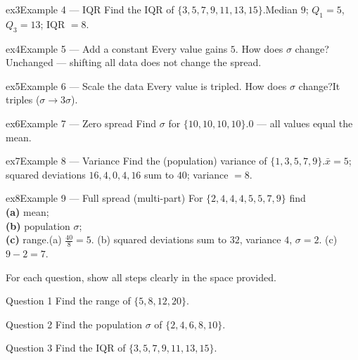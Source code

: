 \documentclass[11pt]{article}
\begin{document}
\begin{example}{ex3}{Example 4 --- IQR}
Find the IQR of $\{3,5,7,9,11,13,15\}$.\soln Median $9$; $Q_1=5$, $Q_3=13$; IQR $=8$.
\end{example}

\begin{example}{ex4}{Example 5 --- Add a constant}
Every value gains $5$. How does $\sigma$ change?\soln Unchanged --- shifting all data does not change the spread.
\end{example}

\begin{example}{ex5}{Example 6 --- Scale the data}
Every value is tripled. How does $\sigma$ change?\soln It triples ($\sigma\to3\sigma$).
\end{example}

\begin{example}{ex6}{Example 7 --- Zero spread}
Find $\sigma$ for $\{10,10,10,10\}$.\soln $0$ --- all values equal the mean.
\end{example}

\begin{example}{ex7}{Example 8 --- Variance}
Find the (population) variance of $\{1,3,5,7,9\}$.\soln $\bar x=5$; squared deviations $16,4,0,4,16$ sum to $40$; variance $=8$.
\end{example}

\begin{example}{ex8}{Example 9 --- Full spread (multi-part)}
For $\{2,4,4,4,5,5,7,9\}$ find \\ \textbf{(a)} mean; \\ \textbf{(b)} population $\sigma$; \\ \textbf{(c)} range.\soln (a) $\tfrac{40}{8}=5$. (b) squared deviations sum to $32$, variance $4$, $\sigma=2$. (c) $9-2=7$.
\end{example}

\clearpage
{}
For each question, show all steps clearly in the space provided.

\begin{qbox}{Question 1}
Find the range of $\{5,8,12,20\}$.\workspace{2.4cm}
\end{qbox}

\begin{qbox}{Question 2}
Find the population $\sigma$ of $\{2,4,6,8,10\}$.\workspace{2.4cm}
\end{qbox}

\begin{qbox}{Question 3}
Find the IQR of $\{3,5,7,9,11,13,15\}$.\workspace{2.4cm}
\end{qbox}
\end{document}
